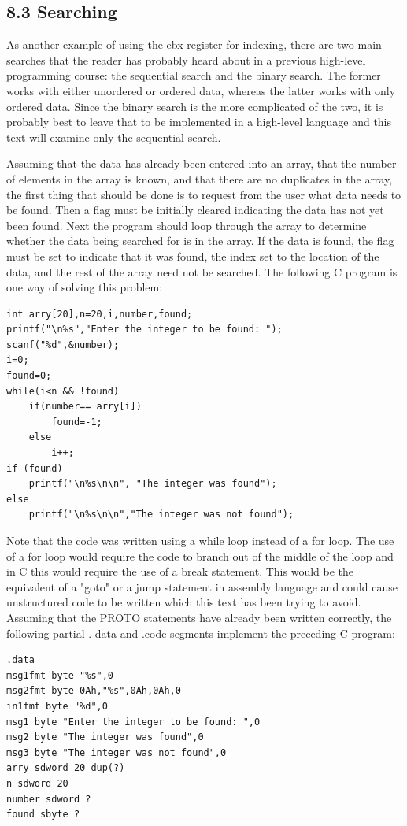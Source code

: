 \documentclass[10pt]{article}
\begin{document}
\subsection*{8.3 Searching}
As another example of using the ebx register for indexing, there are two main searches that the reader has probably heard about in a previous high-level programming course: the sequential search and the binary search. The former works with either unordered or ordered data, whereas the latter works with only ordered data. Since the binary search is the more complicated of the two, it is probably best to leave that to be implemented in a high-level language and this text will examine only the sequential search.

Assuming that the data has already been entered into an array, that the number of elements in the array is known, and that there are no duplicates in the array, the first thing that should be done is to request from the user what data needs to be found. Then a flag must be initially cleared indicating the data has not yet been found. Next the program should loop through the array to determine whether the data being searched for is in the array. If the data is found, the flag must be set to indicate that it was found, the index set to the location of the data, and the rest of the array need not be searched. The following C program is one way of solving this problem:

\begin{verbatim}
int arry[20],n=20,i,number,found;
printf("\n%s","Enter the integer to be found: ");
scanf("%d",&number);
i=0;
found=0;
while(i<n && !found)
    if(number== arry[i])
        found=-1;
    else
        i++;
if (found)
    printf("\n%s\n\n", "The integer was found");
else
    printf("\n%s\n\n","The integer was not found");
\end{verbatim}

Note that the code was written using a while loop instead of a for loop. The use of a for loop would require the code to branch out of the middle of the loop and in C this would require the use of a break statement. This would be the equivalent of a "goto" or a jump statement in assembly language and could cause unstructured code to be written which this text has been trying to avoid. Assuming that the PROTO statements have already been written correctly, the following partial . data and .code segments implement the preceding C program:

\begin{verbatim}
.data
msg1fmt byte "%s",0
msg2fmt byte 0Ah,"%s",0Ah,0Ah,0
in1fmt byte "%d",0
msg1 byte "Enter the integer to be found: ",0
msg2 byte "The integer was found",0
msg3 byte "The integer was not found",0
arry sdword 20 dup(?)
n sdword 20
number sdword ?
found sbyte ?
\end{verbatim}
\end{document}

